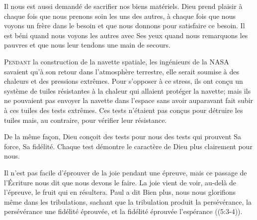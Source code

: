 Il nous est aussi demandé de sacrifier nos biens matériels.
 Dieu prend plaisir à chaque fois que nous prenons soin les uns des autres,
 à chaque fois que nous voyons un frère dans le besoin et que nous donnons
 pour satisfaire ce besoin. Il est béni quand nous voyons les autres
 avec Ses yeux \ocadr quand nous remarquons les pauvres
 et que nous leur tendons une main de secours. 


\dvrule






\lettrine{P}{endant} la construction de la navette spatiale,
 les ingénieurs de la NASA savaient qu'à son retour
 dans l'atmosphère terrestre, elle serait soumise à des chaleurs
 et des pressions extrêmes.
 Pour s'opposer à ce stress, ils ont con\c{c}u un système de tuiles
 résistantes à la chaleur qui allaient protéger la navette;
 mais ils ne pouvaient pas envoyer la navette dans l'espace
 sans avoir auparavant fait subir à ces tuiles des tests extrêmes.
 Ces tests n'étaient pas con\c{c}us pour détruire les tuiles mais,
 au contraire, pour vérifier leur résistance. 

De la même fa\c{c}on, Dieu con\c{c}oit des tests pour nous \ocadr des tests
 qui prouvent Sa force, Sa fidélité. Chaque test démontre
 le caractère de Dieu plus clairement pour nous. 


Il n'est pas facile d'éprouver de la joie pendant une épreuve,
 mais ce passage de l'Écriture nous dit que nous devons le faire.
 La joie vient de voir, au-delà de l'épreuve, le fruit qui en résultera.
 Paul a dit\frcolon {}
 \Og Bien plus, nous nous glorifions même dans les tribulations,
 sachant que la tribulation produit la persévérance,
 la persévérance une fidélité éprouvée,
 et la fidélité éprouvée l'espérance \Fg{} ((5:3-4)). 


